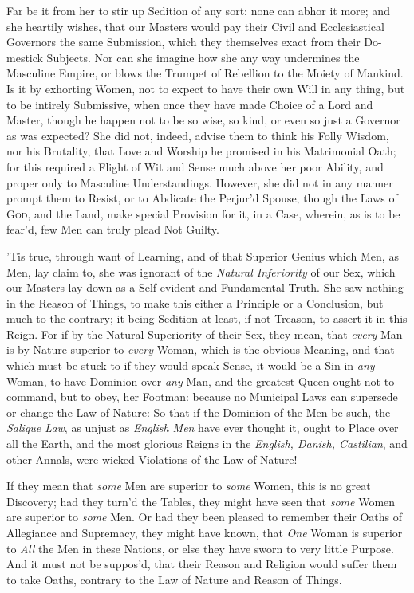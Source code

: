 Far be it from her to stir up Sedition of any sort: none can abhor it
more; and she heartily wishes, that our Masters would pay their Civil
and Ecclesiastical Governors the same Submission, which they
themselves exact from their Do-mestick Subjects. Nor can she
imagine how she any way undermines the Masculine Empire, or blows the
Trumpet of Rebellion to the Moiety of Mankind. Is it by exhorting
Women, not to expect to have their own Will in any thing, but to be
intirely Submissive, when once they have made Choice of a Lord and
Master, though he happen not to be so wise, so kind, or even so just a
Governor as was expected? She did not, indeed, advise them to think
his Folly Wisdom, nor his Brutality, that Love and Worship he promised
in his Matrimonial Oath; for this required a Flight of Wit and Sense
much above her poor Ability, and proper only to Masculine
Understandings. However, she did not in any manner prompt them to
Resist, or to Abdicate the Perjur'd Spouse, though the Laws of
\textsc{God}, and the Land, make special Provision for it, in a Case,
wherein, as is to be fear'd, few Men can truly plead Not Guilty.

'Tis true, through want of Learning, and of that Superior
Genius which Men, as Men, lay claim to, she was ignorant of the
\textit{Natural Inferiority} of our Sex, which our Masters lay down as
a Self-evident and Fundamental Truth. She saw nothing in the Reason of
Things, to make this either a Principle or a Conclusion, but much to
the contrary; it being Sedition at least, if not Treason, to assert it
in this Reign. For if by the Natural Superiority of their Sex, they
mean, that \textit{every} Man is by Nature superior to \textit{every}
Woman, which is the obvious Meaning, and that which must be stuck to
if they would speak Sense, it would be a Sin in \textit{any} Woman, to
have Dominion over \textit{any} Man, and the greatest Queen ought not
to command, but to obey, her Footman: because no Municipal Laws can
supersede or change the Law of Nature: So that if the Dominion of the
Men be such, the \textit{Salique Law}, as unjust as \textit{English
Men} have ever thought it, ought to Place over all  the
Earth, and the most glorious Reigns in the \textit{English, Danish,
Castilian}, and other Annals, were wicked Violations of the Law of
Nature!

If they mean that \textit{some} Men are superior to \textit{some}
Women, this is no great Discovery; had they turn'd the Tables, they
might have seen that \textit{some} Women are superior to \textit{some}
Men. Or had they been pleased to remember their Oaths of Allegiance
and Supremacy, they might have known, that \textit{One} Woman is
superior to \textit{All} the Men in these Nations, or else they have
sworn to very little Purpose. And it must not be suppos'd, that their
Reason and Religion would suffer them to take Oaths, contrary to the
Law of Nature and Reason of Things.

